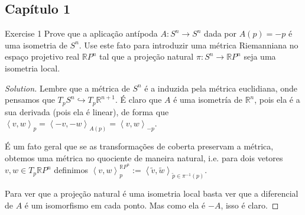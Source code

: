 \subsection{Capítulo 1}

\begin{thing4}{Exercise 1}\label{exer:1}\leavevmode
Prove que a aplicação antípoda \(A:S^n \to S^n\) dada por \(A(p)=-p\) é uma isometria de \(S^n\). Use este fato para introduzir uma métrica Riemanniana no espaço projetivo real \(\mathbb{R}P^{n}\) tal que a projeção natural \(\pi: S^n \to \mathbb{R}P^{n}\) seja uma isometria local.
\end{thing4}
\begin{proof}[Solution]\leavevmode
	Lembre que a métrica de \(S^n\) é a induzida pela métrica euclidiana, onde pensamos que \(T_pS^n \hookrightarrow T_p\mathbb{R}^{n+1}\). É claro que \(A\) é uma isometría de \(\mathbb{R}^n\), pois ela é a sua derivada (pois ela é linear), de forma que \(\left<v,w\right>_p=\left<-v,-w\right>_{A(p)}=\left<v,w\right>_{-p}\).

	É um fato geral que se as transformações de coberta preservam a métrica, obtemos uma métrica no quociente de maneira natural, i.e. para dois vetores \(v,w\in T_p\mathbb{R}P^n\) definimos \(\left<v,w\right>_p^{\mathbb{R}P^n}:=\left<\tilde{v},\tilde{w}\right>_{\tilde{p} \in \pi^{-1}(p)}\).

Para ver que a projeção natural é uma isometria local basta ver que a diferencial de \(A\) é um isomorfismo em cada ponto. Mas como ela é \(-A\), isso é claro.
\end{proof}

